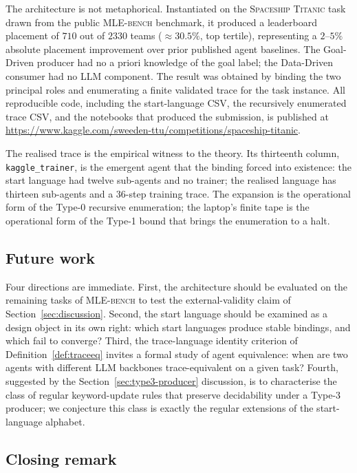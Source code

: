 The architecture is not metaphorical.  Instantiated on the
\textsc{Spaceship Titanic} task drawn from the public
\textsc{MLE-bench} benchmark, it produced a leaderboard placement
of $710$ out of $2330$ teams ($\approx\!30.5\%$, top tertile),
representing a $2$--$5\%$ absolute placement improvement over
prior published agent baselines.  The Goal-Driven producer had
no a priori knowledge of the goal label; the Data-Driven
consumer had no LLM component.  The result was obtained by binding the two principal roles and
enumerating a finite validated trace for the task instance.  All
reproducible code, including the start-language CSV, the
recursively enumerated trace CSV, and the notebooks that produced
the submission, is published at\\
\url{https://www.kaggle.com/sweeden-ttu/competitions/spaceship-titanic}.

The realised trace is the empirical witness to the theory.  Its
thirteenth column, \texttt{kaggle\_trainer}, is the emergent
agent that the binding forced into existence: the start language
had twelve sub-agents and no trainer; the realised language has
thirteen sub-agents and a 36-step training trace.  The expansion
is the operational form of the Type-0 recursive enumeration; the
laptop's finite tape is the operational form of the Type-1 bound
that brings the enumeration to a halt.

\subsection{Future work}

Four directions are immediate.  First, the architecture should
be evaluated on the remaining tasks of \textsc{MLE-bench} to
test the external-validity claim of
Section~\ref{sec:discussion}.  Second, the start language should
be examined as a design object in its own right: which start
languages produce stable bindings, and which fail to converge?
Third, the trace-language identity criterion of
Definition~\ref{def:traceeq} invites a formal study of agent
equivalence: when are two agents with different LLM backbones
trace-equivalent on a given task?  Fourth, suggested by the
Section~\ref{sec:type3-producer} discussion, is to characterise
the class of regular keyword-update rules that preserve
decidability under a Type-3 producer; we conjecture this class
is exactly the regular extensions of the start-language alphabet.

\subsection{Closing remark}

